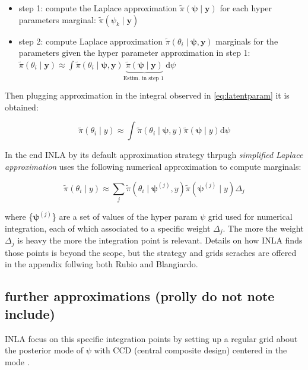 \documentclass[
  12pt,
  a4paper,
  oneside]{book}
\providecommand{\tightlist}{%
  \setlength{\itemsep}{0pt}\setlength{\parskip}{0pt}}
\begin{document}
\begin{itemize}
\tightlist
\item
  step 1: compute the Laplace approximation \(\tilde\pi\left(\boldsymbol{\psi} \mid \boldsymbol{y}\right)\) for each hyper parameters marginal: \(\tilde\pi\left(\psi_{k} \mid \boldsymbol{y}\right)\)
\item
  step 2: compute Laplace approximation \(\tilde{\pi}\left(\theta_{i} \mid \boldsymbol{\psi}, \boldsymbol{y}\right)\) marginals for the parameters given the hyper parameter approximation in step 1: \(\tilde{\pi}\left(\theta_{i} \mid \boldsymbol{y}\right) \approx \int \tilde{\pi}\left(\theta_{i} \mid \boldsymbol{\psi}, \boldsymbol{y}\right) \underbrace{\tilde{\pi}(\boldsymbol{\psi} \mid \boldsymbol{y})}_{\text {Estim. in step 1 }} \mathrm{d} \psi\)
\end{itemize}

Then plugging approximation in the integral observed in \eqref{eq:latentparam} it is obtained:

\[
\tilde{\pi}\left(\theta_{i} \mid y\right) \approx \int \tilde{\pi}\left(\theta_{i} \mid  \boldsymbol{\psi}, y\right) \tilde{\pi}(\boldsymbol{\psi} \mid y) \mathrm{d} \psi
\]

In the end INLA by its default approximation strategy thrpugh \emph{simplified Laplace approximation} uses the following numerical approximation to compute marginals:

\[
\tilde{\pi}\left(\theta_{i} \mid y\right) \approx \sum_{j} \tilde{\pi}\left(\theta_{i} \mid \boldsymbol{\psi}^{(j)}, y\right) \tilde{\pi}\left(\boldsymbol{\psi}^{(j)} \mid y\right) \Delta_{j}
\]

where \{\(\boldsymbol{\psi}^{(j)}\)\} are a set of values of the hyper param \(\psi\) grid used for numerical integration, each of which associated to a specific weight \(\Delta_{j}\). The more the weight \(\Delta_{j}\) is heavy the more the integration point is relevant. Details on how INLA finds those points is beyond the scope, but the strategy and grids seraches are offered in the appendix follwing both Rubio and Blangiardo.

\hypertarget{further-approximations-prolly-do-not-note-include}{%
\subsection{further approximations (prolly do not note include)}\label{further-approximations-prolly-do-not-note-include}}

INLA focus on this specific integration points by setting up a regular grid about the posterior mode of \(\psi\) with CCD (central composite design) centered in the mode \citep{Bayesian_INLA_Rubio}.
\end{document}
